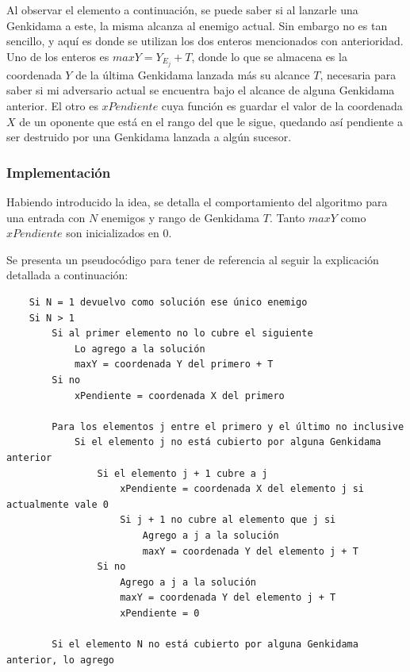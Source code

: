 	Al observar el elemento a continuación, se puede saber si al lanzarle una
	Genkidama a este, la misma alcanza al enemigo actual. Sin embargo no
	es tan sencillo, y aquí es donde se utilizan los dos enteros mencionados con
	anterioridad. Uno de los enteros es $maxY = Y_{E_j} + T$, donde lo que se
	almacena es la coordenada $Y$ de la última Genkidama lanzada más su alcance
	$T$, necesaria para saber si mi adversario actual se encuentra bajo el
	alcance de alguna Genkidama anterior. El otro es $xPendiente$ cuya función
	es guardar el valor de la coordenada $X$ de un oponente que está en el
	rango del que le sigue, quedando así pendiente a ser destruido por una
	Genkidama lanzada a algún sucesor.

	\subsubsection{Implementación}\label{ej2_imp}

	Habiendo introducido la idea, se detalla el comportamiento del algoritmo para
	una entrada con $N$ enemigos y rango de Genkidama $T$. Tanto $maxY$ como
	$xPendiente$ son inicializados en 0.

	Se presenta un pseudocódigo para tener de referencia al seguir la
	explicación detallada a continuación:

	\begin{codesnippet}
	\begin{verbatim}
	Si N = 1 devuelvo como solución ese único enemigo
	Si N > 1
	    Si al primer elemento no lo cubre el siguiente
	        Lo agrego a la solución
	        maxY = coordenada Y del primero + T
	    Si no
	        xPendiente = coordenada X del primero

	    Para los elementos j entre el primero y el último no inclusive
	        Si el elemento j no está cubierto por alguna Genkidama anterior
	            Si el elemento j + 1 cubre a j
	                xPendiente = coordenada X del elemento j si actualmente vale 0
	                Si j + 1 no cubre al elemento que j si
	                    Agrego a j a la solución
	                    maxY = coordenada Y del elemento j + T
	            Si no
	                Agrego a j a la solución
	                maxY = coordenada Y del elemento j + T
	                xPendiente = 0

	    Si el elemento N no está cubierto por alguna Genkidama anterior, lo agrego
	\end{verbatim}
	\end{codesnippet}

